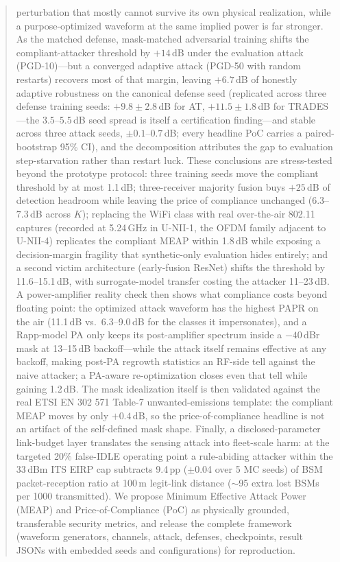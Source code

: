 \documentclass[review]{elsarticle}
\begin{document}
\begin{frontmatter}
\begin{abstract}
perturbation that mostly cannot survive its own physical realization, while
a purpose-optimized waveform at the same implied power is far stronger. As the matched defense, mask-matched adversarial training shifts
the compliant-attacker threshold by $+14$\,dB under the evaluation attack
(PGD-10)---but a converged adaptive attack (PGD-50 with random restarts)
recovers most of that margin, leaving $+6.7$\,dB of honestly adaptive
robustness on the canonical defense seed (replicated across three defense
training seeds: $+9.8\pm2.8$\,dB for AT, $+11.5\pm1.8$\,dB for TRADES---the
$3.5$--$5.5$\,dB seed spread is itself a certification finding---and
stable across three attack seeds, $\pm0.1$--$0.7$\,dB; every headline
PoC carries a paired-bootstrap 95\% CI), and the
decomposition attributes the
gap to evaluation step-starvation rather than restart luck. These conclusions are stress-tested beyond the prototype protocol: three
training seeds move the compliant threshold by at most 1.1\,dB;
three-receiver majority fusion buys $+25$\,dB of detection headroom while
leaving the price of compliance unchanged ($6.3$--$7.3$\,dB across $K$);
replacing
the WiFi class with real over-the-air 802.11 captures (recorded at
5.24\,GHz in U-NII-1, the OFDM family adjacent to U-NII-4) replicates the
compliant MEAP within 1.8\,dB while exposing a decision-margin fragility
that synthetic-only evaluation hides entirely; and a second victim
architecture (early-fusion ResNet) shifts the threshold by 11.6--15.1\,dB,
with surrogate-model transfer costing the attacker 11--23\,dB. A
power-amplifier reality check then shows what compliance costs beyond
floating point: the optimized attack waveform has the highest PAPR on the
air (11.1\,dB vs.\ 6.3--9.0\,dB for the classes it impersonates), and a
Rapp-model PA only keeps its post-amplifier spectrum inside a
$-40$\,dBr mask at 13--15\,dB backoff---while the attack itself remains
effective at any backoff, making post-PA regrowth statistics an RF-side
tell against the naive attacker; a PA-aware re-optimization closes even
that tell while gaining 1.2\,dB. The mask idealization itself is then
validated against the real ETSI EN 302 571 Table-7 unwanted-emissions
template: the compliant MEAP moves by only $+0.4$\,dB, so the
price-of-compliance headline is not an artifact of the self-defined mask
shape. Finally, a disclosed-parameter link-budget layer translates the
sensing attack into fleet-scale harm: at the targeted 20\% false-IDLE
operating point a rule-abiding attacker within the 33\,dBm ITS EIRP cap
subtracts 9.4\,pp ($\pm$0.04 over 5 MC seeds) of BSM packet-reception ratio at 100\,m legit-link
distance ($\sim$95 extra lost BSMs per 1000 transmitted). We propose Minimum Effective Attack Power (MEAP) and
Price-of-Compliance (PoC) as physically grounded, transferable security
metrics, and release the complete framework (waveform generators, channels,
attack, defenses, checkpoints, result JSONs with embedded seeds and
configurations) for reproduction.
\end{abstract}


\end{frontmatter}
\end{document}
